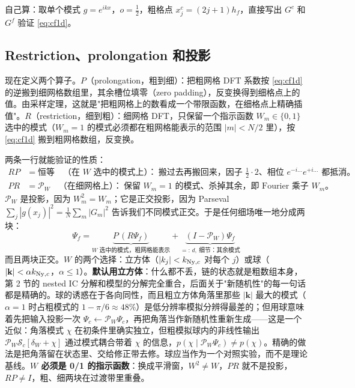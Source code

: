 \documentclass[11pt,UTF8,fontset=none]{ctexart}
\newcommand{\kk}{\mathbf{k}}
\newcommand{\Ny}{{\rm Ny}}
\newcommand{\PW}{\mathcal P_W}
\newcommand{\Sim}{\mathcal S}
\newenvironment{box*}{\begin{quote}\itshape}{\end{quote}}
\begin{document}
\begin{box*}
自己算：取单个模式 $g=e^{ikx}$，$o=\tfrac12$，粗格点 $x^c_j=(2j+1)h_f$，直接写出 $G^c$ 和 $G^f$ 验证 \eqref{eq:cf1d}。
\end{box*}

\subsection{Restriction、prolongation 和投影}

现在定义两个算子。$P$（prolongation，粗到细）：把粗网格 DFT 系数按 \eqref{eq:cf1d} 的逆搬到细网格数组里，其余槽位填零（zero padding），反变换得到细格点上的值。由采样定理，这就是"把粗网格上的数看成一个带限函数，在细格点上精确插值"。$R$（restriction，细到粗）：细网格 DFT，只保留一个指示函数 $W_m\in\{0,1\}$ 选中的模式（$W_m=1$ 的模式必须都在粗网格能表示的范围 $|m|<N/2$ 里），按 \eqref{eq:cf1d} 搬到粗网格数组，反变换。

两条一行就能验证的性质：
\begin{align}
RP&=\text{恒等}\quad\text{（在 $W$ 选中的模式上）：}\ \text{搬过去再搬回来，因子 $\tfrac12\cdot2$、相位 $e^{-i\ldots}e^{+i\ldots}$ 都抵消。}\\
PR&=\PW\quad\text{（在细网格上）：}\ \text{保留 $W_m=1$ 的模式、杀掉其余，即 Fourier 乘子 $W_m$。}
\end{align}
$\PW$ 是投影，因为 $W_m^2=W_m$；它是正交投影，因为 Parseval $\sum_j|g(x_j)|^2=\frac1N\sum_m|G_m|^2$ 告诉我们不同模式正交。于是任何细场唯一地分成两块：
\begin{equation}
\boxed{\;\Psi_f=\underbrace{P\,(R\Psi_f)}_{\text{$W$ 选中的模式，粗网格能表示}}+\underbrace{(I-\PW)\Psi_f}_{=:\,d,\ \text{细节：其余模式}}\;}
\label{eq:decomp}
\end{equation}
而且两块正交。$W$ 的两个选择：立方体（$|k_j|<k_{\Ny,c}$ 对每个 $j$）或球（$|\kk|<\alpha k_{\Ny,c}$，$\alpha\le1$）。\textbf{默认用立方体}：什么都不丢，链的状态就是粗数组本身，第 2 节的 nested IC 分解和模型的分解完全重合，后面关于"新随机性"的每一句话都是精确的。球的诱惑在于各向同性，而且粗立方体角落里那些 $|\kk|$ 最大的模式（$\alpha=1$ 时占粗模式的 $1-\pi/6\approx48\%$）是低分辨率模拟分辨得最差的；但用球意味着先把输入投影一次 $\Psi_c\leftarrow\PW\Psi_c$，再把角落当作新随机性重新生成——这是一个近似：角落模式 $\chi$ 在初条件里确实独立，但粗模拟球内的非线性输出 $\PW\Sim_c[\delta_W+\chi]$ 通过模式耦合带着 $\chi$ 的信息，$p(\chi\mid\PW\Psi_c)\neq p(\chi)$。精确的做法是把角落留在状态里、交给修正带去修。球应当作为一个对照实验，而不是理论基线。\textbf{$W$ 必须是 0/1 的指示函数}：换成平滑窗，$W^2\neq W$，$PR$ 就不是投影，$RP\neq I$，粗、细两块在过渡带里重叠。
\end{document}
